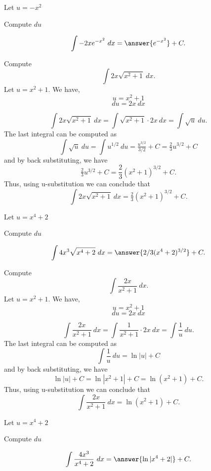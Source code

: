 \documentclass{ximera}
\begin{document}
\begin{problem}
\begin{hint}
Let $u = -x^2$
\end{hint}
\begin{hint}
Compute $du$
\end{hint}
\[\int -2xe^{-x^2} \ dx = \answer{e^{-x^2}} +C.\]
\end{problem}

\begin{example} Compute 
\[\int 2x\sqrt{x^2 + 1} \ dx.\]
Let $u = x^2 + 1$.  We have,
\[u = x^2 + 1\]
\[du = 2x \ dx\]

\[\int 2x\sqrt{x^2 + 1} \ dx = \int \sqrt{x^2 + 1} \cdot 2x\  dx = \int \sqrt{u} \ du.\]
The last integral can be computed as 
\[\int \sqrt u  \ du = \int u^{1/2} \ du = \tfrac{u^{3/2}}{3/2} + C = \tfrac23 u^{3/2} + C\]
and by back substituting, we have 
\[\tfrac23 u^{3/2}  + C = \frac23 (x^2 + 1)^{3/2} + C.\]
Thus, using u-substitution we can conclude that
\[\int 2x\sqrt{x^2 + 1} \ dx =  \tfrac23 (x^2 + 1)^{3/2} + C.\]
\end{example}

\begin{problem}
\begin{hint}
Let $u = x^4 + 2$
\end{hint}
\begin{hint}
Compute $du$
\end{hint}
\[\int 4x^3 \sqrt{x^4 +2} \ dx = \answer{2/3(x^4 +2)^{3/2}} +C.\]
\end{problem}



\begin{example} Compute 
\[\int \frac{2x}{x^2 + 1} \ dx.\]
Let $u = x^2 + 1$.  We have,
\[u = x^2 + 1\]
\[du = 2x \ dx\]

\[\int \frac{2x}{x^2 + 1} \ dx = \int \frac{1}{x^2 + 1} \cdot 2x\  dx = \int \frac{1}{u} \ du.\]
The last integral can be computed as 
\[\int \frac{1}{u} \ du = \ln|u| + C\]
and by back substituting, we have 
\[\ln|u| + C =  \ln|x^2 + 1| + C=\ln(x^2 + 1) + C.\]
Thus, using u-substitution we can conclude that
\[\int \frac{2x}{x^2 + 1} \ dx =  \ln(x^2 + 1) + C.\]
\end{example}


\begin{problem}
\begin{hint}
Let $u = x^4 + 2$
\end{hint}
\begin{hint}
Compute $du$
\end{hint}
\[\int \frac{4x^3}{x^4 +2} \ dx = \answer{\ln|x^4 +2|} +C.\]
\end{problem}
\end{document}
